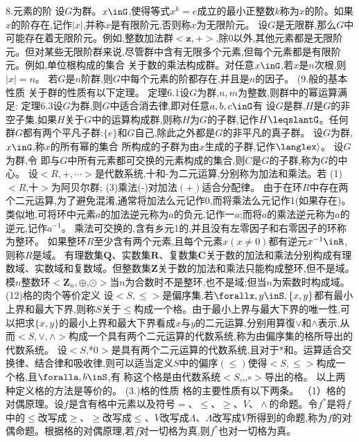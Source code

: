 {8.元素的阶}
设$G$为群。$x\inG$,使得等式$x^{k}=e$成立的最小正整数$k$称为$x$的阶。如果$x$的阶存在,记作$|x|$,并称$x$是有限阶元,否则称$x$为无限阶元。
设$G$是无限群,那么$G$中可能存在着无限阶元。例如,整数加法群$<\mathbf{z},+>$,除0以外,其他元素都是无限阶元。但对某些无限阶群来说,尽管群中含有无限多个元素,但每个元素都是有限阶元。例如,单位根构成的集合
关于数的乘法构成群。对任意$x\inG$,若$x$是$n$次根,则$|x|=n$。
若$G$是$n$阶群,则$G$中每个元素的阶都存在,并且是$n$的因子。
{(9.般的基本性质}
关于群的性质有以下定理。
定理6.1设$G$为群,$n,m$为整数,则群中的幂运算满足:
定理6.3设$G$为群,则$G$中适合消去律,即对任意$a,b,c\inG$有
设$G$是群,$H$是$G$的非空子集,如果$H$关于$G$中的运算构成群,则称$H$为$G$的子群,记作$H\leqslantG$。任何群$G$都有两个平凡子群:$\{e\}$和$G$自己,除此之外都是$G$的非平凡的真子群。
设$G$为群,$x\inG$,称$x$的所有幂的集合
所构成的子群为由$x$生成的子群,记作$\langlex\rangle$。
设$G$为群,令
即与$G$中所有元素都可交换的元素构成的集合,则$C$是$G$的子群,称为$G$的中心。
设$<R,+,\cdots>$是代数系统,十和-为二元运算,分别称为加法和乘法。若
(1)$<R$,十$>$为阿贝尔群;
(3)乘法(-)对加法$(+)$适合分配律。
由于在环$R$中存在两个二元运算,为了避免混淆,通常将加法么元记作0,而将乘法么元记作1(如果存在)。类似地,可将环中元素$a$的加法逆元称为$a$的负元,记作一$a$;而将$a$的乘法逆元称为$a$的逆元,记作$a^{-1}$。
乘法可交换的,含有乡元1的,并且没有左零因子和右零因子的环称为整环。
如果整环$R$至少含有两个元素,且每个元素$x(x\neq0)$都有逆元$x^{-1}\inR$,则称$R$是域。
有理数集$\mathbf{Q}$、实数集$\mathbf{R}$、复数集$\mathbf{C}$关于数的加法和乘法分别构成有理数域、实数域和复数域。但整数集$\mathbf{Z}$关于数的加法和乘法只能构成整环,但不是域。模$n$整数环$<\mathbf{Z}_{n},\oplus$,$\odot>$当$n$为合数时不是整环,也不是域;但当$n$为索数时构成域。
(12)格的肉个等价定义
设$<S,\leqslant>$是偏序集,若$\forallx,y\inS,\{x,y\}$都有最小上界和最大下界,则称$S$关于$\leqslant$构成一个格。由于最小上界与最大下界的唯一性,可以把求$\{x,y\}$的最小上界和最大下界看成$x$与$y$的二元运算,分别用算復$\vee$和$\wedge$表示,从而$<S,\vee,\wedge>$构成一个具有两个二元运算的代数系统,称为由偏序集的格所导出的代数系统。
设$<S$,*$0>$是具有两个二元运算的代数系统,且对于*和。运算适合交换律、结合律和吸收律,则可以适当定义$S$中的偏序$(\leqslant)$使得$<S,\leqslant>$构成一个格,且$\foralla,b\inS$,有
称这个格是由代数系统$<S$,,,$\circ>$导出的格。
以上两种定义格的方法是等价的。
{(3.)格的性质}
格的主要性质有以下两条。
（1）格的对偶原理。设$f$是含有格中元素以及符号$=、\leqslant、\geqslant、V、\wedge$的命题。令$f^{*}$是将$f$中的$\leqslant$改写成$\geqslant、\geqslant$改写成$\leqslant、V$改写成$\Lambda、\Lambda$改写成$V$所得到的命题,称为$f$的对偶命题。根据格的对偶原理,若$f$对一切格为真,则$f^{*}$也对一切格为真。
